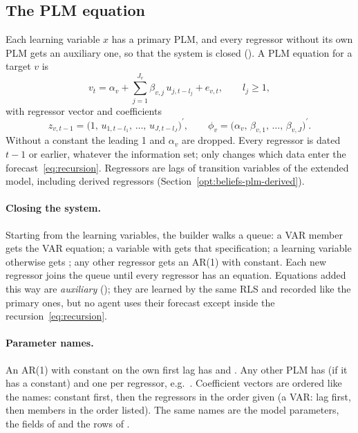 \documentclass[11pt,a4paper]{article}
\newcommand{\transp}{^{\prime}}
\begin{document}
\subsection{The PLM equation}\label{sec:plmeq}

Each learning variable $x$ has a primary PLM, and every regressor without its own PLM gets an
auxiliary one, so that the system is closed (). A PLM equation for a
target $v$ is
\begin{equation}\label{eq:plm}
  v_t = \alpha_v + \sum_{j=1}^{J_v} \beta_{v,j}\, u_{j,t-l_j} + e_{v,t},
  \qquad l_j \ge 1,
\end{equation}
with regressor vector and coefficients
\begin{equation}\label{eq:zphi}
  z_{v,t-1} = \bigl(1,\, u_{1,t-l_1},\, \dots,\, u_{J,t-l_J}\bigr)\transp, \qquad
  \phi_v = \bigl(\alpha_v,\, \beta_{v,1},\, \dots,\, \beta_{v,J}\bigr)\transp .
\end{equation}
Without a constant the leading 1 and $\alpha_v$ are dropped. Every regressor is dated $t-1$ or
earlier, whatever the information set;  only changes which data enter the
forecast~\eqref{eq:recursion}. Regressors are lags of transition variables of the extended
model, including derived regressors (Section~\ref{opt:beliefs-plm-derived}).

\paragraph{Closing the system.} Starting from the learning variables, the builder walks a queue:
a VAR member gets the VAR equation; a variable with  gets that
specification; a learning variable otherwise gets ; any other regressor
gets an AR(1) with constant. Each new regressor joins the queue until every regressor has an
equation. Equations added this way are \emph{auxiliary} (); they are learned
by the same RLS and recorded like the primary ones, but no agent uses their forecast except
inside the recursion~\eqref{eq:recursion}.

\paragraph{Parameter names.}\label{sec:plmnames} An AR(1) with constant on the own first lag has
 and . Any other PLM has  (if it has a constant) and one
 per regressor, e.g.\ . Coefficient vectors are
ordered like the names: constant first, then the regressors in the order given (a VAR: lag first,
then members in the order listed). The same names are the model parameters, the fields of
 and the rows of .
\end{document}

